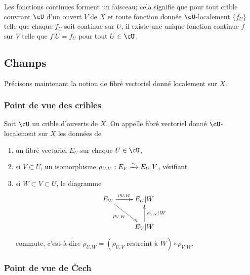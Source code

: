\subsubsection{}\label{I:1-2-3}

Les fonctions continues forment un faisceau; cela signifie que pour tout crible 
couvrant $\cU$ d'un ouvert $V$ de $X$ et toute fonction donnée 
$\cU$-localement $\{f_U\}$ telle que chaque $f_U$ soit continue sur $U$, il 
existe une unique fonction continue $f$ sur $V$ telle que $f|U=f_U$ pour tout 
$U\in \cU$.










\subsection{Champs}\label{I:1-3}

Précisons maintenant la notion de fibré vectoriel donné localement sur $X$. 





\subsubsection{Point de vue des cribles}\label{I:1-3-1}

Soit $\cU$ un crible d'ouverts de $X$. On appelle fibré vectoriel donné 
$\cU$-localement sur $X$ les données de 
\begin{enumerate}[\indent a)]
  \item un fibré vectoriel $E_U$ sur chaque $U\in \cU$, 
  \item si $V\subset U$, un isomorphisme $\rho_{U,V} : E_V\xrightarrow\sim E_U|V$, vérifiant 
  \item si $W\subset V\subset U$, le diagramme 
    \[\xymatrix{
      E_W \ar[r]^-{\rho_{U,W}} \ar[dr]_-{\rho_{V,W}}
        & E_U|W \\
      & E_V|W \ar[u]_-{\rho_{U,V}|W}
    }\]
    commute, c'est-à-dire 
    $\rho_{U,W} = (\mbox{$\rho_{U,V}$ restreint à $W$}) \circ \rho_{V,W}$. 
\end{enumerate}





\subsubsection{Point de vue de Čech}\label{I:1-3-2}

